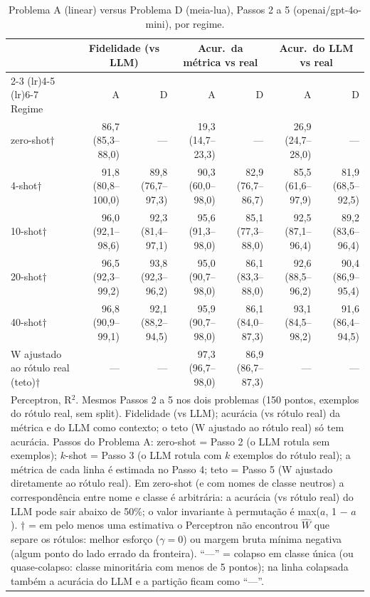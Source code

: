 \begin{table}[htbp]
\centering
\small
\caption{Problema A (linear) versus Problema D (meia-lua), Passos 2 a 5 (openai/gpt-4o-mini), por regime.}
\label{tab:bloco1_AD_por_passo_gpt4mini}
\begin{tabular}{lrrrrrr}
\toprule
 & \multicolumn{2}{c}{Fidelidade (vs LLM)} & \multicolumn{2}{c}{Acur.\ da métrica vs real} & \multicolumn{2}{c}{Acur.\ do LLM vs real} \\ \cmidrule(lr){2-3} \cmidrule(lr){4-5} \cmidrule(lr){6-7}
Regime & A & D & A & D & A & D \\
\midrule
zero-shot† & 86,7 (85,3–88,0) & — & 19,3 (14,7–23,3) & — & 26,9 (24,7–28,0) & — \\
4-shot† & 91,8 (80,8–100,0) & 89,8 (76,7–97,3) & 90,3 (60,0–98,0) & 82,9 (76,7–86,7) & 85,5 (61,6–97,9) & 81,9 (68,5–92,5) \\
10-shot† & 96,0 (92,1–98,6) & 92,3 (81,4–97,1) & 95,6 (91,3–98,0) & 85,1 (77,3–88,0) & 92,5 (87,1–96,4) & 89,2 (83,6–96,4) \\
20-shot† & 96,5 (92,3–99,2) & 93,8 (92,3–96,2) & 95,0 (90,7–98,0) & 86,1 (83,3–88,0) & 92,6 (88,5–96,2) & 90,4 (86,9–95,4) \\
40-shot† & 96,8 (90,9–99,1) & 92,1 (88,2–94,5) & 95,9 (90,7–98,0) & 86,1 (84,0–87,3) & 93,1 (84,5–98,2) & 91,6 (86,4–94,5) \\
\midrule
W ajustado ao rótulo real (teto)† & — & — & 97,3 (96,7–98,0) & 86,9 (86,7–87,3) & — & — \\
\bottomrule
\multicolumn{7}{p{0.95\linewidth}}{\footnotesize Perceptron, R$^2$. Mesmos Passos 2 a 5 nos dois problemas (150 pontos, exemplos do rótulo real, sem split). Fidelidade (vs LLM); acurácia (vs rótulo real) da métrica e do LLM como contexto; o teto (W ajustado ao rótulo real) só tem acurácia. Passos do Problema A: zero-shot = Passo 2 (o LLM rotula sem exemplos); $k$-shot = Passo 3 (o LLM rotula com $k$ exemplos do rótulo real); a métrica de cada linha é estimada no Passo 4; teto = Passo 5 (W ajustado diretamente ao rótulo real). Em zero-shot (e com nomes de classe neutros) a correspondência entre nome e classe é arbitrária: a acurácia (vs rótulo real) do LLM pode sair abaixo de 50\%; o valor invariante à permutação é max($a$, 1 $-$ $a$). † = em pelo menos uma estimativa o Perceptron não encontrou $\hat{W}$ que separe os rótulos: melhor esforço ($\gamma = 0$) ou margem bruta mínima negativa (algum ponto do lado errado da fronteira). ``—'' = colapso em classe única (ou quase-colapso: classe minoritária com menos de 5 pontos); na linha colapsada também a acurácia do LLM e a partição ficam como ``—''.} \\
\end{tabular}
\end{table}
